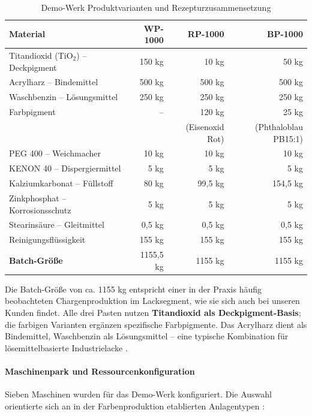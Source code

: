 \begin{table}[h]
\centering
\caption{Demo-Werk Produktvarianten und Rezepturzusammensetzung}
\label{tab:DemoProdukte}
\begin{tabular}{lrrr}
\hline
\textbf{Material} & \textbf{WP-1000} & \textbf{RP-1000} & \textbf{BP-1000} \\
\hline
Titandioxid (TiO$_2$) -- Deckpigment & 150 kg & 10 kg & 50 kg \\
Acrylharz -- Bindemittel & 500 kg & 500 kg & 500 kg \\
Waschbenzin -- Lösungsmittel & 250 kg & 250 kg & 250 kg \\
Farbpigment & -- & 120 kg & 25 kg \\
 & & (Eisenoxid Rot) & (Phthaloblau PB15:1) \\
PEG 400 -- Weichmacher & 10 kg & 10 kg & 10 kg \\
KENON 40 -- Dispergiermittel & 5 kg & 5 kg & 5 kg \\
Kalziumkarbonat -- Füllstoff & 80 kg & 99,5 kg & 154,5 kg \\
Zinkphosphat -- Korrosionsschutz & 5 kg & 5 kg & 5 kg \\
Stearinsäure -- Gleitmittel & 0,5 kg & 0,5 kg & 0,5 kg \\
Reinigungsflüssigkeit & 155 kg & 155 kg & 155 kg \\
\hline
\textbf{Batch-Größe} & 1155,5 kg & 1155 kg & 1155 kg \\
\hline
\end{tabular}
\end{table}

Die Batch-Größe von ca. 1155 kg entspricht einer in der Praxis häufig beobachteten Chargenproduktion im Lacksegment, wie sie sich auch bei unseren Kunden findet. Alle drei Pasten nutzen \textbf{Titandioxid als Deckpigment-Basis}; die farbigen Varianten ergänzen spezifische Farbpigmente. Das Acrylharz dient als Bindemittel, Waschbenzin als Lösungsmittel -- eine typische Kombination für lösemittelbasierte Industrielacke \citep{vci:lacke_farben2018}.


\paragraph{Maschinenpark und Ressourcenkonfiguration}

Sieben Maschinen wurden für das Demo-Werk konfiguriert. Die Auswahl orientierte sich an in der Farbenproduktion etablierten Anlagentypen \citep{vci:lacke_farben2018}:

